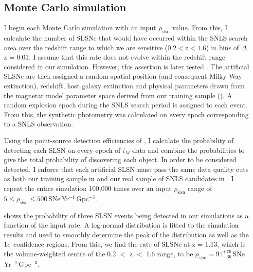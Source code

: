\subsection{Monte Carlo simulation}
\label{sec:rate-calculation}
I begin each Monte Carlo simulation with an input $\rho_{\mathrm{slsn}}$ value. From this, I calculate the number of SLSNe that would have occurred within the SNLS search area over the redshift range to which we are sensitive ($0.2<\mathrm{z}<1.6$) in bins of $\Delta$z = 0.01. I assume that this rate does not evolve within the redshift range considered in our simulation. However, this assertion is later tested . The artificial SLSNe are then assigned a random spatial position (and consequent Milky Way extinction), redshift, host galaxy extinction and physical parameters drawn from the magnetar model parameter space derived from our training sample (). A random explosion epoch during the SNLS search period is assigned to each event. From this, the synthetic photometry was calculated on every epoch corresponding to a SNLS observation.

Using the point-source detection efficiencies of \cite{Perrett2010}, I calculate the probability of detecting each SLSN on every epoch of $i_M$ data and combine the probabilities to give the total probability of discovering each object. In order to be considered detected, I enforce that each artificial SLSN must pass the same data quality cuts as both our training sample in  and our real sample of SNLS candidates in . I repeat the entire simulation 100,000 times over an input $\rho_{\mathrm{slsn}}$ range of $5 \leq \rho_{\mathrm{slsn}} \leq 500$\,SNe\,Yr$^{-1}$\,Gpc$^{-3}$.

 shows the probability of three SLSN events being detected in our simulations as a function of the input rate. A log-normal distribution is fitted to the simulation results and used to smoothly determine the peak of the distribution as well as the 1$\sigma$ confidence regions. From this, we find the rate of SLSNe at z = 1.13, which is the volume-weighted centre of the 0.2 $<$ z $<$ 1.6 range, to be $\rho_{\mathrm{slsn}} = 91^{+76}_{-36}$\,SNe\,Yr$^{-1}$\,Gpc$^{-3}$.

